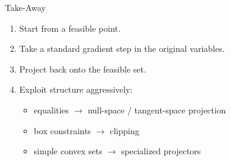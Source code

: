\documentclass[11pt,compress,t,notes=noshow, xcolor=table]{beamer}
\begin{document}
\begin{framev}{Take-Away}
\begin{enumerate}
\item Start from a feasible point.
\item Take a standard gradient step in the original variables.
\item Project back onto the feasible set.
\item Exploit structure aggressively:
\begin{itemize}
\item equalities $\rightarrow$ null-space / tangent-space projection
\item box constraints $\rightarrow$ clipping
\item simple convex sets $\rightarrow$ specialized projectors
\end{itemize}
\end{enumerate}
\vfill
{}
\end{framev}

\endlecture
\end{document}
